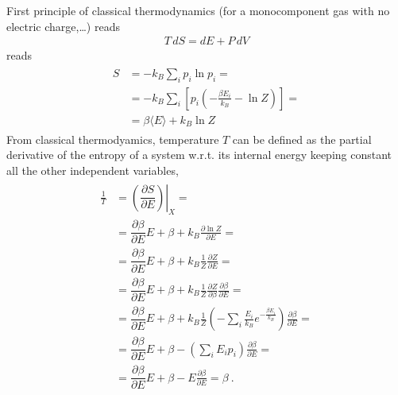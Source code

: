 \documentclass[letterpaper,10pt,english]{jupyterBook}
\begin{document}
\sphinxAtStartPar
First principle of classical thermodynamics (for a monocomponent gas with no electric charge,…) reads
\begin{equation*}
\begin{split}T \, dS = d E + P \, dV\end{split}
\end{equation*}
\sphinxAtStartPar
{} reads
\begin{equation*}
\begin{split}\begin{aligned}
  S 
  & = - k_B \sum_i p_i \ln p_i = \\
  & = - k_B \sum_i \left[ p_i \left( - \frac{\beta E_i}{k_B} - \ln Z \right) \right] = \\
  & = \beta \langle E \rangle + k_B \ln Z
\end{aligned}\end{split}
\end{equation*}
\sphinxAtStartPar
From classical thermodyamics, temperature \(T\) can be defined as the partial derivative of the entropy of a system w.r.t. its internal energy keeping constant all the other independent variables,
\begin{equation*}
\begin{split}\begin{aligned}
  \frac{1}{T}
  & = \left.\left( \dfrac{\partial S}{\partial E} \right)\right|_X = \\
  & = \dfrac{\partial \beta}{\partial E} E + \beta + k_B \frac{\partial \ln Z}{\partial E} = \\
  & = \dfrac{\partial \beta}{\partial E} E + \beta + k_B \frac{1}{Z} \frac{\partial Z}{\partial E} = \\
  & = \dfrac{\partial \beta}{\partial E} E + \beta + k_B \frac{1}{Z} \frac{\partial Z}{\partial \beta} \frac{\partial \beta}{\partial E} = \\
  & = \dfrac{\partial \beta}{\partial E} E + \beta + k_B \frac{1}{Z} \left( - \sum_i \frac{E_i}{k_B} e^{-\frac{\beta E_i}{k_B}} \right) \frac{\partial \beta}{\partial E} = \\
  & = \dfrac{\partial \beta}{\partial E} E + \beta - \left( \sum_i E_i p_i \right) \frac{\partial \beta}{\partial E} = \\
  & = \dfrac{\partial \beta}{\partial E} E + \beta - E \frac{\partial \beta}{\partial E} = \beta \ .
\end{aligned}\end{split}
\end{equation*}
\end{document}
